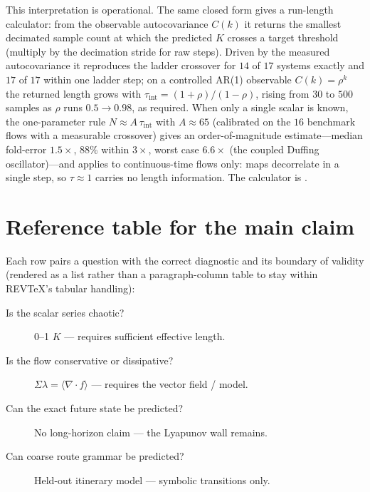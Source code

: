 \documentclass[aip,cha,preprint,amsmath,amssymb,floatfix]{revtex4-2}
\begin{document}
This interpretation is operational. The same closed form gives a run-length
calculator: from the observable autocovariance $C(k)$ it returns the smallest
decimated sample count at which the predicted $K$ crosses a target threshold
(multiply by the decimation stride for raw steps). Driven by the measured
autocovariance it reproduces the ladder crossover for $14$ of $17$ systems
exactly and $17$ of $17$ within one ladder step; on a controlled AR(1) observable
$C(k)=\rho^k$ the returned length grows with
$\tau_{\mathrm{int}}=(1+\rho)/(1-\rho)$, rising from $30$ to $500$ samples as
$\rho$ runs $0.5\to0.98$, as required. When only a single scalar is
known, the one-parameter rule $N\approx A\,\tau_{\mathrm{int}}$ with $A\approx65$
(calibrated on the $16$ benchmark flows with a measurable crossover) gives an
order-of-magnitude estimate---median fold-error $1.5\times$, $88\%$ within
$3\times$, worst case $6.6\times$ (the coupled Duffing oscillator)---and applies
to continuous-time flows only: maps decorrelate in a single step, so
$\tau\approx1$ carries no length information. The calculator is
.

\section{Reference table for the main claim}

\noindent Each row pairs a question with the correct diagnostic and its boundary
of validity (rendered as a list rather than a paragraph-column table to stay
within REVTeX's tabular handling):

\begin{description}
\item[Is the scalar series chaotic?] 0--1 $K$ --- requires sufficient effective length.
\item[Is the flow conservative or dissipative?] $\Sigma\lambda=\langle\nabla\!\cdot f\rangle$ --- requires the vector field / model.
\item[Can the exact future state be predicted?] No long-horizon claim --- the Lyapunov wall remains.
\item[Can coarse route grammar be predicted?] Held-out itinerary model --- symbolic transitions only.
\end{description}
\end{document}

